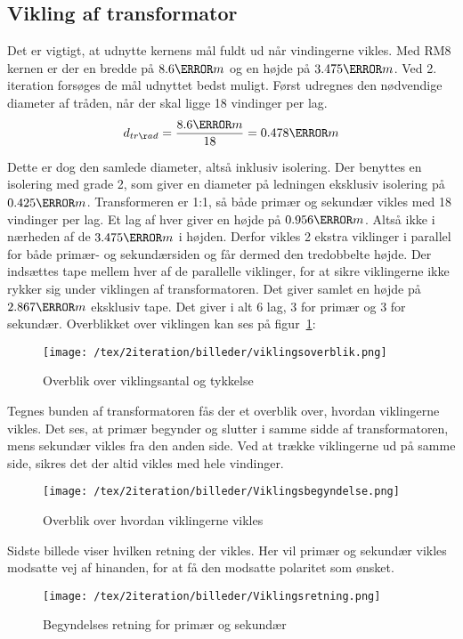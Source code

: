 \subsection{Vikling af transformator}
Det er vigtigt, at udnytte kernens mål fuldt ud når vindingerne vikles. Med RM8 kernen er der en bredde på $8.6\milli m$ og en højde på $3.475\milli m$. Ved 2. iteration forsøges de mål udnyttet bedst muligt.
Først udregnes den nødvendige diameter af tråden, når der skal ligge 18 vindinger per lag. 
\begin{equation} \label{d_trad}
d_{tråd} = \frac{8.6\milli m}{18} = 0.478\milli m
\end{equation}

Dette er dog den samlede diameter, altså inklusiv isolering. Der benyttes en isolering med grade 2, som giver en diameter på ledningen eksklusiv isolering på $0.425\milli m$\cite{wire-diameter}. Transformeren er 1:1, så både primær og sekundær vikles med 18 vindinger per lag. Et lag af hver giver en højde på $0.956\milli m$. Altså ikke i nærheden af de $3.475\milli m$ i højden. Derfor vikles 2 ekstra viklinger i parallel for både primær- og sekundærsiden og får dermed den tredobbelte højde. Der indsættes tape mellem hver af de parallelle viklinger, for at sikre viklingerne ikke rykker sig under viklingen af transformatoren. Det giver samlet en højde på $2.867\milli m$ eksklusiv tape. Det giver i alt 6 lag, 3 for primær og 3 for sekundær. Overblikket over viklingen kan ses på figur~\ref{fig: viklingsoverblik}:
\begin{figure}[H]
	\center
	\texttt{[image: /tex/2iteration/billeder/viklingsoverblik.png]}
	\caption{Overblik over viklingsantal og tykkelse}
	\label{fig: viklingsoverblik}
\end{figure}

\noindent Tegnes bunden af transformatoren fås der et overblik over, hvordan viklingerne vikles. Det ses, at primær begynder og slutter i samme sidde af transformatoren, mens sekundær vikles fra den anden side. Ved at trække viklingerne ud på samme side, sikres det der altid vikles med hele vindinger.
\begin{figure}[H]
	\center
	\texttt{[image: /tex/2iteration/billeder/Viklingsbegyndelse.png]}
	\caption{Overblik over hvordan viklingerne vikles}
	\label{fig: viklingsbegyndelse}
\end{figure}

\noindent Sidste billede viser hvilken retning der vikles. Her vil primær og sekundær vikles modsatte vej af hinanden, for at få den modsatte polaritet som ønsket.
\begin{figure}[H]
	\center
	\texttt{[image: /tex/2iteration/billeder/Viklingsretning.png]}
	\caption{Begyndelses retning for primær og sekundær}
	\label{fig: viklingsretning}
\end{figure}

